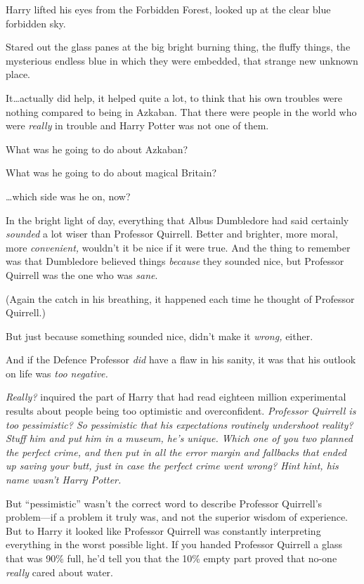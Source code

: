 Harry lifted his eyes from the Forbidden Forest, looked up at the clear blue forbidden sky.

Stared out the glass panes at the big bright burning thing, the fluffy things, the mysterious endless blue in which they were embedded, that strange new unknown place.

It…actually did help, it helped quite a lot, to think that his own troubles were nothing compared to being in Azkaban. That there were people in the world who were \emph{really} in trouble and Harry Potter was not one of them.

What was he going to do about Azkaban?

What was he going to do about magical Britain?

…which side was he on, now?

In the bright light of day, everything that Albus Dumbledore had said certainly \emph{sounded} a lot wiser than Professor Quirrell. Better and brighter, more moral, more \emph{convenient,} wouldn’t it be nice if it were true. And the thing to remember was that Dumbledore believed things \emph{because} they sounded nice, but Professor Quirrell was the one who was \emph{sane}.

(Again the catch in his breathing, it happened each time he thought of Professor Quirrell.)

But just because something sounded nice, didn’t make it \emph{wrong,} either.

And if the Defence Professor \emph{did} have a flaw in his sanity, it was that his outlook on life was \emph{too negative.}

\emph{Really?} inquired the part of Harry that had read eighteen million experimental results about people being too optimistic and overconfident. \emph{Professor Quirrell is too pessimistic? So pessimistic that his expectations routinely \emph{undershoot} reality? Stuff him and put him in a museum, he’s unique. Which one of you two planned the perfect crime, and \emph{then} put in all the error margin and fallbacks that ended up saving your butt, \emph{just in case} the perfect crime went wrong? Hint hint, his name wasn’t Harry Potter.}

But “pessimistic” wasn’t the correct word to describe Professor Quirrell’s problem—if a problem it truly was, and not the superior wisdom of experience. But to Harry it looked like Professor Quirrell was constantly interpreting everything in the worst possible light. If you handed Professor Quirrell a glass that was 90\% full, he’d tell you that the 10\% empty part proved that no-one \emph{really} cared about water.

